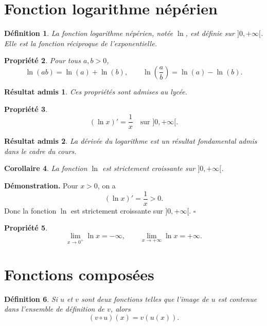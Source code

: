 \documentclass[11pt,a4paper]{article}
\newtheorem{definition}{Définition}[section]
\newtheorem{propriete}[definition]{Propriété}
\newtheorem{corollaire}[definition]{Corollaire}
\newtheorem*{admis}{Résultat admis}
\begin{document}
\section{Fonction logarithme népérien}

\begin{definition}
La fonction logarithme népérien, notée \(\ln\), est définie sur \(]0,+\infty[\). Elle est la fonction réciproque de l'exponentielle.
\end{definition}

\begin{propriete}
Pour tous \(a,b>0\),
\[
\ln(ab)=\ln(a)+\ln(b),\qquad
\ln\left(\frac{a}{b}\right)=\ln(a)-\ln(b).
\]
\end{propriete}

\begin{admis}
Ces propriétés sont admises au lycée.
\end{admis}

\begin{propriete}
\[
(\ln x)'=\frac1x \quad \text{sur } ]0,+\infty[.
\]
\end{propriete}

\begin{admis}
La dérivée du logarithme est un résultat fondamental admis dans le cadre du cours.
\end{admis}

\begin{corollaire}
La fonction \(\ln\) est strictement croissante sur \(]0,+\infty[\).
\end{corollaire}

\textbf{Démonstration.}  
Pour \(x>0\), on a
\[
(\ln x)'=\frac1x>0.
\]
Donc la fonction \(\ln\) est strictement croissante sur \(]0,+\infty[\). \(\square\)

\begin{propriete}
\[
\lim_{x\to 0^+}\ln x=-\infty,\qquad \lim_{x\to +\infty}\ln x=+\infty.
\]
\end{propriete}

\section{Fonctions composées}

\begin{definition}
Si \(u\) et \(v\) sont deux fonctions telles que l'image de \(u\) est contenue dans l'ensemble de définition de \(v\), alors
\[
(v\circ u)(x)=v(u(x)).
\]
\end{definition}
\end{document}
